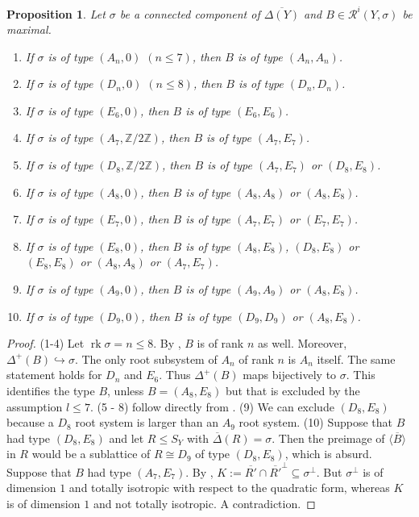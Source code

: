 \documentclass[a4paper]{amsart}
\theoremstyle{definition}
\theoremstyle{plain}
\newtheorem{proposition}[definition]{Proposition}
\DeclareMathOperator{\rk}{rk}
\newcommand{\ZZ}{\mathbb{Z}}
\newcommand{\R}{\mathcal{R}}
\begin{document}
\begin{proposition}\label{lem:Bmaximal_classification}
Let $\sigma$ be a connected component of $\overline{\Delta(Y)}$ and $B \in \R^i(Y,\sigma)$ be maximal.
\begin{enumerate}
\item If $\sigma$ is of type $(A_n, 0)$ $(n\leq 7)$, then $B$ is of type $(A_n,A_n)$. 
\item If $\sigma$ is of type $(D_n, 0)$ $(n\leq 8)$, then $B$ is of type $(D_n,D_n)$.
\item If $\sigma$ is of type $(E_6, 0)$, then $B$ is of type $(E_6,E_6)$. 
\item If $\sigma$ is of type $(A_7, \ZZ/2\ZZ)$, then $B$ is of type $(A_7,E_7)$.
\item If $\sigma$ is of type $(D_8, \ZZ/2\ZZ)$, then $B$ is of type $(A_7,E_7)$ or $(D_8,E_8)$.
\item If $\sigma$ is of type $(A_8, 0)$, then $B$ is of type $(A_8,A_8)$ or $(A_8,E_8)$.
\item If $\sigma$ is of type $(E_7, 0)$, then $B$ is of type $(A_7,E_7)$ or $(E_7,E_7)$.
\item If $\sigma$ is of type $(E_8, 0)$, then $B$ is of type $(A_8,E_8)$, $(D_8,E_8)$ or $(E_8,E_8)$ or $(A_8,A_8)$ or $(A_7,E_7)$.
\item If $\sigma$ is of type $(A_9, 0)$, then $B$ is of type $(A_9,A_9)$ or $(A_8,E_8)$.
\item If $\sigma$ is of type $(D_9, 0)$, then $B$ is of type $(D_9,D_9)$ or $(A_8,E_8)$.
\end{enumerate}
\end{proposition}
\begin{proof}
(1-4) Let $\rk \sigma = n\leq 8$. By , $B$ is of rank $n$ as well. Moreover, $\Delta^+(B) \hookrightarrow \sigma$.
The only root subsystem of $A_n$ of rank $n$ is $A_n$ itself.
The same statement holds for $D_n$ and $E_6$. Thus $\Delta^+(B)$ maps bijectively to $\sigma$. This identifies the type $B$, unless $B=(A_8,E_8)$ but that is excluded by the assumption $l \leq 7$.
(5 - 8) follow directly from .
(9) We can exclude $(D_8,E_8)$ because a $D_8$ root system is larger than an $A_9$ root system.
(10) Suppose that $B$ had type $(D_8,E_8)$ and let $R \leq S_Y$ with $\overline{\Delta}(R)=\sigma$. Then the preimage of $\langle \overline{B} \rangle $ in $R$ would be a sublattice of $R\cong D_9$ of type $(D_8,E_8)$, which is absurd. Suppose that $B$ had type $(A_7,E_7)$. By , $K:=\overline{R'}\cap \overline{R'}^\perp \subseteq \sigma^\perp$. But $\sigma^\perp$ is of dimension $1$ and totally isotropic with respect to the quadratic form, whereas $K$ is of dimension $1$ and not totally isotropic. A contradiction.  
\end{proof}
\end{document}
